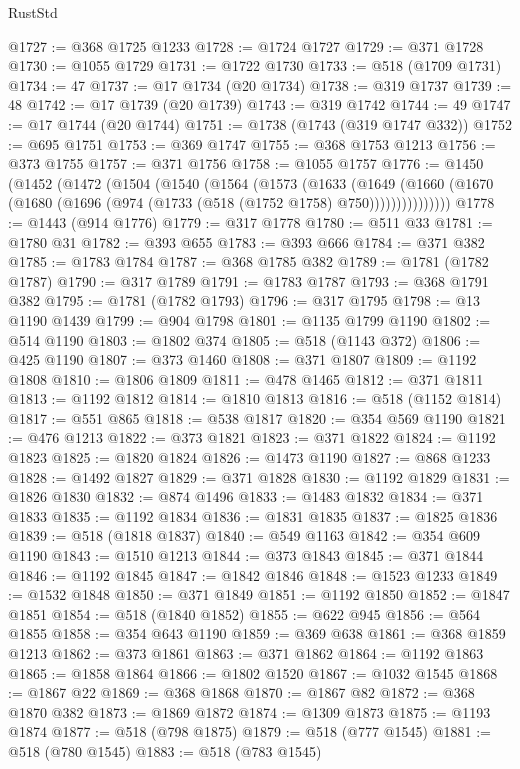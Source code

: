 \begin{lexlean}{RustStd}
\begin{coremodule}
{\begin{coremodule}
{{{{{{{{{{{{{{{{{{{{{{{{{{{{{{{{{{{{{{{{{{{{{{{{{{@1727 := @368 @1725 @1233
@1728 := @1724 @1727
@1729 := @371 @1728
@1730 := @1055 @1729
@1731 := @1722 @1730
@1733 := @518 (@1709 @1731)
@1734 := 47
@1737 := @17 @1734 (@20 @1734)
@1738 := @319 @1737
@1739 := 48
@1742 := @17 @1739 (@20 @1739)
@1743 := @319 @1742
@1744 := 49
@1747 := @17 @1744 (@20 @1744)
@1751 := @1738 (@1743 (@319 @1747 @332))
@1752 := @695 @1751
@1753 := @369 @1747
@1755 := @368 @1753 @1213
@1756 := @373 @1755
@1757 := @371 @1756
@1758 := @1055 @1757
@1776 := @1450
    (@1452
      (@1472
        (@1504
          (@1540
            (@1564
              (@1573
                (@1633
                  (@1649
                    (@1660 (@1670 (@1680 (@1696 (@974 (@1733 (@518 (@1752 @1758) @750)))))))))))))))
@1778 := @1443 (@914 @1776)
@1779 := @317 @1778
@1780 := @511 @33
@1781 := @1780 @31
@1782 := @393 @655
@1783 := @393 @666
@1784 := @371 @382
@1785 := @1783 @1784
@1787 := @368 @1785 @382
@1789 := @1781 (@1782 @1787)
@1790 := @317 @1789
@1791 := @1783 @1787
@1793 := @368 @1791 @382
@1795 := @1781 (@1782 @1793)
@1796 := @317 @1795
@1798 := @13 @1190 @1439
@1799 := @904 @1798
@1801 := @1135 @1799 @1190
@1802 := @514 @1190
@1803 := @1802 @374
@1805 := @518 (@1143 @372)
@1806 := @425 @1190
@1807 := @373 @1460
@1808 := @371 @1807
@1809 := @1192 @1808
@1810 := @1806 @1809
@1811 := @478 @1465
@1812 := @371 @1811
@1813 := @1192 @1812
@1814 := @1810 @1813
@1816 := @518 (@1152 @1814)
@1817 := @551 @865
@1818 := @538 @1817
@1820 := @354 @569 @1190
@1821 := @476 @1213
@1822 := @373 @1821
@1823 := @371 @1822
@1824 := @1192 @1823
@1825 := @1820 @1824
@1826 := @1473 @1190
@1827 := @868 @1233
@1828 := @1492 @1827
@1829 := @371 @1828
@1830 := @1192 @1829
@1831 := @1826 @1830
@1832 := @874 @1496
@1833 := @1483 @1832
@1834 := @371 @1833
@1835 := @1192 @1834
@1836 := @1831 @1835
@1837 := @1825 @1836
@1839 := @518 (@1818 @1837)
@1840 := @549 @1163
@1842 := @354 @609 @1190
@1843 := @1510 @1213
@1844 := @373 @1843
@1845 := @371 @1844
@1846 := @1192 @1845
@1847 := @1842 @1846
@1848 := @1523 @1233
@1849 := @1532 @1848
@1850 := @371 @1849
@1851 := @1192 @1850
@1852 := @1847 @1851
@1854 := @518 (@1840 @1852)
@1855 := @622 @945
@1856 := @564 @1855
@1858 := @354 @643 @1190
@1859 := @369 @638
@1861 := @368 @1859 @1213
@1862 := @373 @1861
@1863 := @371 @1862
@1864 := @1192 @1863
@1865 := @1858 @1864
@1866 := @1802 @1520
@1867 := @1032 @1545
@1868 := @1867 @22
@1869 := @368 @1868
@1870 := @1867 @82
@1872 := @368 @1870 @382
@1873 := @1869 @1872
@1874 := @1309 @1873
@1875 := @1193 @1874
@1877 := @518 (@798 @1875)
@1879 := @518 (@777 @1545)
@1881 := @518 (@780 @1545)
@1883 := @518 (@783 @1545)
}}}}}}}}}}}}}}}}}}}}}}}}}}}}}}}}}}}}}}}}}}}}}}}}}}
\end{coremodule}}
\end{coremodule}
\end{lexlean}
